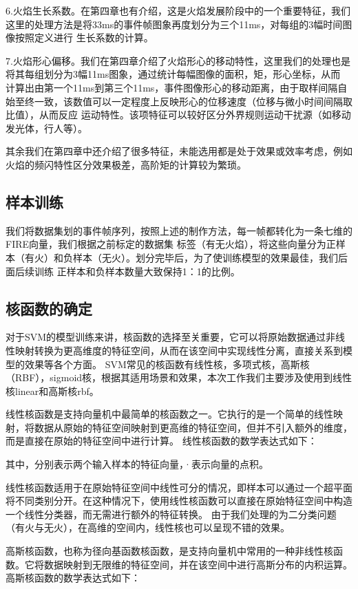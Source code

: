 6.火焰生长系数。在第四章也有介绍，这是火焰发展阶段中的一个重要特征，我们这里的处理方法是将33ms的事件帧图象再度划分为三个11ms，对每组的3幅时间图像按照定义进行
生长系数的计算。

7.火焰形心偏移。我们在第四章介绍了火焰形心的移动特性，这里我们的处理也是将其每组划分为3幅11ms图象，通过统计每幅图像的面积，矩，形心坐标，从而
计算出由第一个11ms到第三个11ms，事件图像形心的移动距离，由于取样间隔自始至终一致，该数值可以一定程度上反映形心的位移速度（位移与微小时间间隔取比值），从而反应
运动特性。该项特征可以较好区分外界规则运动干扰源（如移动发光体，行人等）。

其余我们在第四章中还介绍了很多特征，未能选用都是处于效果或效率考虑，例如火焰的频闪特性区分效果极差，高阶矩的计算较为繁琐。
\subsection{样本训练}
我们将数据集划的事件帧序列，按照上述的制作方法，每一帧都转化为一条七维的FIRE向量，我们根据之前标定的数据集
标签（有无火焰），将这些向量分为正样本（有火）和负样本（无火）。划分完毕后，为了使训练模型的效果最佳，我们后面后续训练
正样本和负样本数量大致保持1：1的比例。
\subsection{核函数的确定}
对于SVM的模型训练来讲，核函数的选择至关重要，它可以将原始数据通过非线性映射转换为更高维度的特征空间，从而在该空间中实现线性分离，直接关系到模型的效果等各个方面。
SVM常见的核函数有线性核，多项式核，高斯核（RBF），sigmoid核，根据其适用场景和效果，本次工作我们主要涉及使用到线性核linear和高斯核rbf。

线性核函数是支持向量机中最简单的核函数之一。它执行的是一个简单的线性映射，将数据从原始的特征空间映射到更高维的特征空间，但并不引入额外的维度，而是直接在原始的特征空间中进行计算。
线性核函数的数学表达式如下：

其中，分别表示两个输入样本的特征向量，·表示向量的点积。

线性核函数适用于在原始特征空间中线性可分的情况，即样本可以通过一个超平面将不同类别分开。在这种情况下，使用线性核函数可以直接在原始特征空间中构造一个线性分类器，而无需进行额外的特征转换。
由于我们处理的为二分类问题（有火与无火），在高维的空间内，线性核也可以呈现不错的效果。

高斯核函数，也称为径向基函数核函数，是支持向量机中常用的一种非线性核函数。它将数据映射到无限维的特征空间，并在该空间中进行高斯分布的内积运算。
高斯核函数的数学表达式如下：

